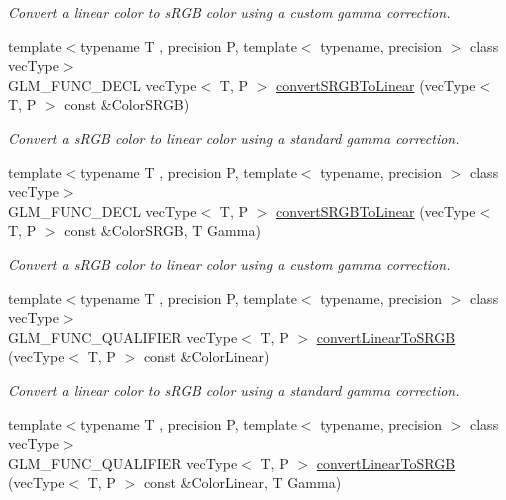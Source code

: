 \begin{DoxyCompactItemize}
\begin{DoxyCompactList}\small\item\em Convert a linear color to s\+R\+G\+B color using a custom gamma correction. \end{DoxyCompactList}\item 
{\footnotesize template$<$typename T , precision P, template$<$ typename, precision $>$ class vec\+Type$>$ }\\G\+L\+M\+\_\+\+F\+U\+N\+C\+\_\+\+D\+E\+C\+L vec\+Type$<$ T, P $>$ \hyperlink{group__gtc__color__space_ga28e98e64347cf385cadc1ceb4def55c9}{convert\+S\+R\+G\+B\+To\+Linear} (vec\+Type$<$ T, P $>$ const \&Color\+S\+R\+G\+B)
\begin{DoxyCompactList}\small\item\em Convert a s\+R\+G\+B color to linear color using a standard gamma correction. \end{DoxyCompactList}\item 
{\footnotesize template$<$typename T , precision P, template$<$ typename, precision $>$ class vec\+Type$>$ }\\G\+L\+M\+\_\+\+F\+U\+N\+C\+\_\+\+D\+E\+C\+L vec\+Type$<$ T, P $>$ \hyperlink{group__gtc__color__space_ga61c4f0efdf55c29d9cfbd26141fddef8}{convert\+S\+R\+G\+B\+To\+Linear} (vec\+Type$<$ T, P $>$ const \&Color\+S\+R\+G\+B, T Gamma)
\begin{DoxyCompactList}\small\item\em Convert a s\+R\+G\+B color to linear color using a custom gamma correction. \end{DoxyCompactList}\item 
{\footnotesize template$<$typename T , precision P, template$<$ typename, precision $>$ class vec\+Type$>$ }\\G\+L\+M\+\_\+\+F\+U\+N\+C\+\_\+\+Q\+U\+A\+L\+I\+F\+I\+E\+R vec\+Type$<$ T, P $>$ \hyperlink{group__gtc__color__space_gad813dcd99644cafc775e83d6504ccb93}{convert\+Linear\+To\+S\+R\+G\+B} (vec\+Type$<$ T, P $>$ const \&Color\+Linear)
\begin{DoxyCompactList}\small\item\em Convert a linear color to s\+R\+G\+B color using a standard gamma correction. \end{DoxyCompactList}\item 
{\footnotesize template$<$typename T , precision P, template$<$ typename, precision $>$ class vec\+Type$>$ }\\G\+L\+M\+\_\+\+F\+U\+N\+C\+\_\+\+Q\+U\+A\+L\+I\+F\+I\+E\+R vec\+Type$<$ T, P $>$ \hyperlink{group__gtc__color__space_ga63f8b003da7acf44370eb47bfb8b3d42}{convert\+Linear\+To\+S\+R\+G\+B} (vec\+Type$<$ T, P $>$ const \&Color\+Linear, T Gamma)

\end{DoxyCompactItemize}
